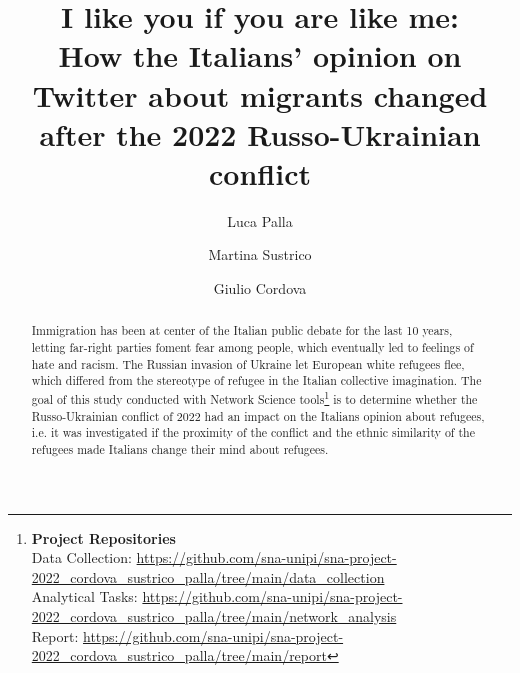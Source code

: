 \documentclass[sigchi]{acmart}
\begin{document}
%
\title[I like you if you are like me]{I like you if you are like me:\\
How the Italians' opinion on Twitter about migrants changed after the 2022 Russo-Ukrainian conflict}

%
\author{Luca Palla}

\author{Martina Sustrico}

\author{Giulio Cordova}




\renewcommand{\shortauthors}{Cordova, Palla, Sustrico}


\begin{abstract}
Immigration has been at center of the Italian public debate for the last 10 years, letting far-right parties foment fear among people, which eventually led to feelings of hate and racism. The Russian invasion of Ukraine let European white refugees flee, which differed from the stereotype of refugee in the Italian collective imagination.
The goal of this study conducted with Network Science tools\footnote{
{\bf Project Repositories}\\
\noindent Data Collection: \url{https://github.com/sna-unipi/sna-project-2022_cordova_sustrico_palla/tree/main/data_collection}\\
\noindent Analytical Tasks: \url{https://github.com/sna-unipi/sna-project-2022_cordova_sustrico_palla/tree/main/network_analysis}\\
\noindent Report: \url{https://github.com/sna-unipi/sna-project-2022_cordova_sustrico_palla/tree/main/report}} is to determine whether the Russo-Ukrainian conflict of 2022 had an impact on the Italians opinion about refugees, i.e. it was investigated if the proximity of the conflict and the ethnic similarity of the refugees made Italians change their mind about refugees.


\end{abstract}
\end{document}
